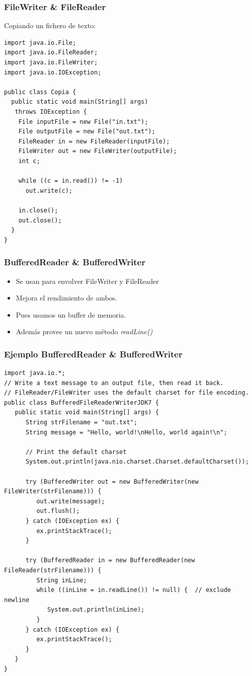 \documentclass{beamer}
\begin{document}
\begin{frame}[fragile]
\frametitle{FileWriter \& FileReader}
Copiando un fichero de texto:
\begin{footnotesize}
\begin{verbatim}
import java.io.File;
import java.io.FileReader;
import java.io.FileWriter;
import java.io.IOException;

public class Copia {
  public static void main(String[] args)
   throws IOException {
    File inputFile = new File("in.txt");
    File outputFile = new File("out.txt");
    FileReader in = new FileReader(inputFile);
    FileWriter out = new FileWriter(outputFile);
    int c;

    while ((c = in.read()) != -1)
      out.write(c);

    in.close();
    out.close();
  }
}
\end{verbatim}
\end{footnotesize}
\end{frame}

\begin{frame}[fragile]
\frametitle{BufferedReader \& BufferedWriter}
\begin{itemize}[<+->]
\item Se usan para envolver FileWriter y FileReader
\item Mejora el rendimiento de ambos.
\item Pues usamos un buffer de memoria.
\item Además provee un nuevo método \emph{readLine()}
\end{itemize}
\end{frame}

\begin{frame}[fragile]
\frametitle{Ejemplo BufferedReader \& BufferedWriter}
\begin{tiny}
\begin{verbatim}
import java.io.*;
// Write a text message to an output file, then read it back.
// FileReader/FileWriter uses the default charset for file encoding.
public class BufferedFileReaderWriterJDK7 {
   public static void main(String[] args) {
      String strFilename = "out.txt";
      String message = "Hello, world!\nHello, world again!\n";  

      // Print the default charset
      System.out.println(java.nio.charset.Charset.defaultCharset());
 
      try (BufferedWriter out = new BufferedWriter(new FileWriter(strFilename))) {
         out.write(message);
         out.flush();
      } catch (IOException ex) {
         ex.printStackTrace();
      }
 
      try (BufferedReader in = new BufferedReader(new FileReader(strFilename))) {
         String inLine;
         while ((inLine = in.readLine()) != null) {  // exclude newline
            System.out.println(inLine);
         }
      } catch (IOException ex) {
         ex.printStackTrace();
      }
   }
}
\end{verbatim}
\end{tiny}
\end{frame}
\end{document}
